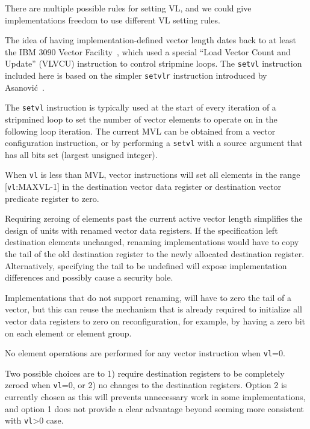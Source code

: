 \begin{discussion}
  There are multiple possible rules for setting VL, and we could give
  implementations freedom to use different VL setting rules.
\end{discussion}

\begin{commentary}
  The idea of having implementation-defined vector length dates back
  to at least the IBM 3090 Vector Facility~\cite{ibm370varch}, which
  used a special ``Load Vector Count and Update'' (VLVCU) instruction
  to control stripmine loops.  The {\tt setvl} instruction included
  here is based on the simpler {\tt setvlr} instruction introduced by
  Asanovi\'{c}~\cite{krstephd}.
\end{commentary}

The {\tt setvl} instruction is typically used at the start of every
iteration of a stripmined loop to set the number of vector elements to
operate on in the following loop iteration.  The current MVL can be
obtained from a vector configuration instruction, or by performing a
{\tt setvl} with a source argument that has all bits set (largest
unsigned integer).

When {\tt vl} is less than MVL, vector instructions will set all
elements in the range [{\tt vl}:MAXVL-1] in the destination vector
data register or destination vector predicate register to zero.

\begin{commentary}
  Requiring zeroing of elements past the current active vector length
  simplifies the design of units with renamed vector data registers.
  If the specification left destination elements unchanged, renaming
  implementations would have to copy the tail of the old destination
  register to the newly allocated destination register.
  Alternatively, specifying the tail to be undefined will expose
  implementation differences and possibly cause a security hole.

  Implementations that do not support renaming, will have to zero the
  tail of a vector, but this can reuse the mechanism that is already
  required to initialize all vector data registers to zero on
  reconfiguration, for example, by having a zero bit on each element
  or element group.
\end{commentary}

No element operations are performed for any vector instruction when
{\tt vl}=0.

\begin{commentary}
  Two possible choices are to 1) require destination registers to be
  completely zeroed when {\tt vl}=0, or 2) no changes to the
  destination registers.  Option 2 is currently chosen as this will
  prevents unnecessary work in some implementations, and option 1 does
  not provide a clear advantage beyond seeming more consistent with
  {\tt vl}>0 case.
\end{commentary}

